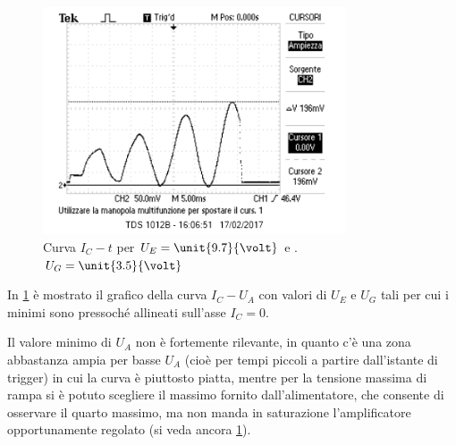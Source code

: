 \documentclass[10pt,a4paper]{article}
\begin{document}
\begin{figure}[h!]
	\centering
	\includegraphics[width=0.80\textwidth]{../oscilloscopio/Task6_3.png}
	\caption{Curva $I_{C} - t$ per $U_{E}=\unit{9.7}{\volt}$ e .$U_{G}=\unit{3.5}{\volt}$}
	\label{task6.3}
\end{figure}

In \figurename{\ref{task6.3}} è mostrato il grafico della curva $I_{C} - U_{A}$ con valori di $U_E$ e $U_G$ tali per cui i minimi sono pressoché allineati sull'asse $I_C = 0$.

Il valore minimo di $U_A$ non è fortemente rilevante, in quanto c'è una zona abbastanza ampia per basse $U_A$ (cioè per tempi piccoli a partire dall'istante di trigger) in cui la curva è piuttosto piatta, mentre per la tensione massima di rampa si è potuto scegliere il massimo fornito dall'alimentatore, che consente di osservare il quarto massimo, ma non manda in saturazione l'amplificatore opportunamente regolato (si veda ancora \figurename{\ref{task6.3}}).

\end{document}
